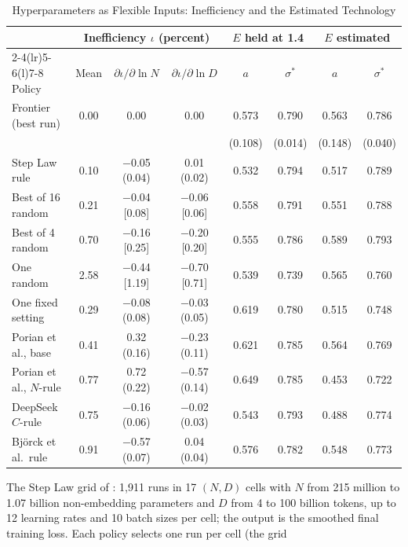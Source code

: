 \begin{table}[tp]
\centering
\caption{Hyperparameters as Flexible Inputs: Inefficiency and the Estimated Technology}
\label{tab:app-steplaw}
\footnotesize
\setlength{\tabcolsep}{2.5pt}
\begin{tabular}{@{}lccccccc@{}}
\toprule
 & \multicolumn{3}{c}{Inefficiency $\iota$ (percent)} & \multicolumn{2}{c}{$E$ held at 1.4} & \multicolumn{2}{c}{$E$ estimated} \\
\cmidrule(lr){2-4}\cmidrule(lr){5-6}\cmidrule(l){7-8}
Policy & Mean & $\partial\iota/\partial\ln N$ & $\partial\iota/\partial\ln D$ & $a$ & $\sigma^*$ & $a$ & $\sigma^*$ \\
\midrule
Frontier (best run) & 0.00 & 0.00 & 0.00 & 0.573 & 0.790 & 0.563 & 0.786 \\
 & & & & (0.108) & (0.014) & (0.148) & (0.040) \\
Step Law rule & 0.10 & $-$0.05 (0.04) & 0.01 (0.02) & 0.532 & 0.794 & 0.517 & 0.789 \\
Best of 16 random & 0.21 & $-$0.04 [0.08] & $-$0.06 [0.06] & 0.558 & 0.791 & 0.551 & 0.788 \\
Best of 4 random & 0.70 & $-$0.16 [0.25] & $-$0.20 [0.20] & 0.555 & 0.786 & 0.589 & 0.793 \\
One random & 2.58 & $-$0.44 [1.19] & $-$0.70 [0.71] & 0.539 & 0.739 & 0.565 & 0.760 \\
One fixed setting & 0.29 & $-$0.08 (0.08) & $-$0.03 (0.05) & 0.619 & 0.780 & 0.515 & 0.748 \\
Porian et al., base & 0.41 & 0.32 (0.16) & $-$0.23 (0.11) & 0.621 & 0.785 & 0.564 & 0.769 \\
Porian et al., $N$-rule & 0.77 & 0.72 (0.22) & $-$0.57 (0.14) & 0.649 & 0.785 & 0.453 & 0.722 \\
DeepSeek $C$-rule & 0.75 & $-$0.16 (0.06) & $-$0.02 (0.03) & 0.543 & 0.793 & 0.488 & 0.774 \\
Bj\"orck et al.\ rule & 0.91 & $-$0.57 (0.07) & 0.04 (0.04) & 0.576 & 0.782 & 0.548 & 0.773 \\
\bottomrule
\end{tabular}
\par\smallskip
\begin{tablenotes}The Step Law grid of \citet{li2025predictablea}: 1,911 runs in 17 $(N,D)$ cells with $N$ from 215
million to 1.07 billion non-embedding parameters and $D$ from 4 to 100 billion tokens, up to 12 learning rates and 10
batch sizes per cell; the output is the smoothed final training loss. Each policy selects one run per cell (the grid

\end{tablenotes}
\end{table}
